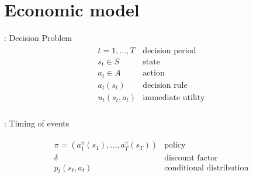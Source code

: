 \section{Economic model}
\begin{frame}{\insertsection: Decision Problem}
\begin{align*}\begin{array}{ll}
t = 1, \hdots, T& \text{decision period} \\[0.5em]
s_t\in S & \text{state}  \\[0.5em]
a_t\in A & \text{action} \\[0.5em]
a_t(s_t) & \text{decision rule} \\[0.5em]
u_t(s_t, a_t) & \text{immediate utility}\\[0.5em]
\end{array}\end{align*}
\end{frame}
\begin{frame}{\insertsection: Timing of events}
\vspace{1.5cm}
\scalebox{0.9}{\hspace{-0.2cm}}
\end{frame}
\begin{frame}{\insertsection}
\begin{align*}\begin{array}{ll}
\pi = (a^\pi_1(s_1), \hdots, a^\pi_T(s_T)) & \text{policy}\\[0.5em]
\delta & \text{discount factor} \\[0.5em]
p_t(s_t, a_t) & \text{conditional distribution}
\end{array}\end{align*}
\end{frame}
